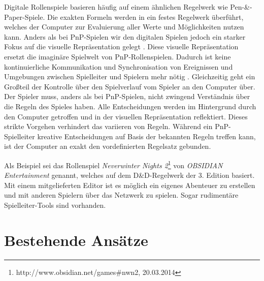 Digitale Rollenspiele basieren häufig auf einem ähnlichen Regelwerk wie Pen-\&-Paper-Spiele. Die exakten Formeln werden in ein festes Regelwerk überführt, welches der Computer zur Evaluierung aller Werte und Möglichkeiten nutzen kann. Anders als bei PnP-Spielen wir den digitalen Spielen jedoch ein starker Fokus auf die visuelle Repräsentation gelegt \cite{Tychsen2006}. Diese visuelle Repräsentation ersetzt die imaginäre Spielwelt von PnP-Rollenspielen. Dadurch ist keine kontinuierliche Kommunikation und Synchronisation von Ereignissen und Umgebungen zwischen Spielleiter und Spielern mehr nötig \cite{Drachen2008}. Gleichzeitig geht ein Großteil der Kontrolle über den Spielverlauf vom Spieler an den Computer über. Der Spieler muss, anders als bei PnP-Spielen, nicht zwingend Verständnis über die Regeln des Spieles haben. Alle Entscheidungen werden im Hintergrund durch den Computer getroffen und in der visuellen Repräsentation reflektiert. Dieses strikte Vorgehen verhindert das variieren von Regeln. Während ein PnP-Spielleiter kreative Entscheidungen auf Basis der bekannten Regeln treffen kann, ist der Computer an exakt den vordefinierten Regelsatz gebunden. \cite{Drachen2008}

\addtocounter{footnote}{1}
\addtocounter{footnote}{1}

Als Beispiel sei das Rollenspiel \emph{Neverwinter Nights 2}\footnote{http://www.obsidian.net/games\#nwn2, 20.03.2014} von \emph{OBSIDIAN Entertainment} genannt, welches auf dem D\&D-Regelwerk der 3. Edition basiert. Mit einem mitgelieferten Editor ist es möglich ein eigenes Abenteuer zu erstellen und mit anderen Spielern über das Netzwerk zu spielen. Sogar rudimentäre Spielleiter-Tools sind vorhanden.~\cite{Tychsen2006a}



\section{Bestehende Ansätze}
\label{sec:BekannteAnsaetze}

